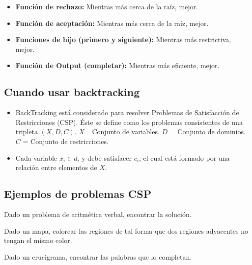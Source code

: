 \documentclass{templateNote}
\begin{document}
\begin{itemize}
    \item \textbf{Función de rechazo:} Mientras más cerca de la raíz, mejor.
    
    \item \textbf{Función de aceptación:} Mientras más cerca de la raíz, mejor.
    
    \item \textbf{Funciones de hijo (primero y siguiente):} Mientras más restrictiva, mejor.
    
    \item \textbf{Función de Output (completar):} Mientras más eficiente, mejor.
\end{itemize}

\subsection*{Cuando usar backtracking}
\begin{itemize}
    \item BackTracking está considerado para resolver Problemas de Satisfacción de Restricciones (CSP).
    Éste se define como los problemas consistentes de una tripleta $(X,D,C)$.
    \subitem $X$= Conjunto de variables.
    \subitem $D$ = Conjunto de dominios.
    \subitem $C$ = Conjunto de restricciones.
    
    \item Cada variable $x_i \in d_i$ y debe satisfacer $c_i$, el cual está formado por una relación entre elementos de $X$.
    
\end{itemize}


\subsection*{Ejemplos de problemas CSP}

\begin{tcolorbox}[colback=blue!4!white,colframe=blue!75!black,title=Aritmética Verbal]
    Dado un problema de aritmética verbal, encontrar la solución.
\end{tcolorbox}

\begin{tcolorbox}[colback=blue!4!white,colframe=blue!75!black,title=Coloración de mapas]
    Dado un mapa, colorear las regiones de tal forma que dos regiones adyacentes no tengan el mismo color.
\end{tcolorbox}

\begin{tcolorbox}[colback=blue!4!white,colframe=blue!75!black,title=Crucigramas]
    Dado un crucigrama, encontrar las palabras que lo completan.
\end{tcolorbox}
\end{document}
